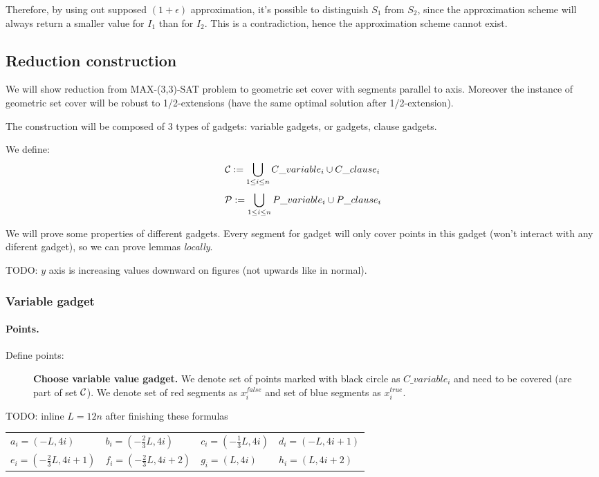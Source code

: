 Therefore, by using out supposed $(1+\epsilon)$ approximation,
it’s possible to distinguish $S_1$ from $S_2$, since
the approximation scheme will always return a smaller value
for $I_1$ than for $I_2$. This is a contradiction,
hence the approximation scheme cannot exist.

\subsection{Reduction construction}
We will show reduction from MAX-(3,3)-SAT problem
to geometric set cover with segments
parallel to axis. Moreover the instance
of geometric set cover will be robust
to 1/2-extensions (have the same optimal solution
after 1/2-extension).

The construction will be composed of 3 types of gadgets:
variable gadgets, or gadgets, clause gadgets.

We define:
$$\mathcal{C} := \bigcup_{1 \le i \le n} C\_variable_i \cup C\_clause_i $$
$$\mathcal{P} := \bigcup_{1 \le i \le n} P\_variable_i \cup P\_clause_i $$

We will prove some properties of different gadgets.
Every segment for gadget will only cover points 
in this gadget (won't interact with any diferent gadget),
so we can prove lemmas \textit{locally}.


TODO: $y$ axis is increasing values downward on figures
(not upwards like in normal).

\subsubsection{Variable gadget}

\paragraph{Points.}

Define points:
\begin{figure}[h]
\centering
\def\svgwidth{0.5\columnwidth}

\caption{\textbf{Choose variable value gadget.}
We denote set of points marked with black circle as $C\_variable_i$
and need to be covered (are part of set $\mathcal{C}$).
We denote set of red segments as $x^{false}_i$
and set of blue segments as $x^{true}_i$.}
\label{fig:apx_choose_variable}
\end{figure}

TODO: inline $L = 12n$ after finishing these formulas

\begin{center}
\begin{tabular}{ l l l l}
	$a_{i} = (-L, 4i)$ &
	$b_{i} = (-\frac{2}{3}L, 4i)$ & 
	$c_{i} = (-\frac{1}{3}L, 4i)$ & 
	$d_{i} = (-L, 4i+1)$ \\  
	$e_{i} = (-\frac{2}{3}L, 4i+1)$ & 
	$f_{i} = (-\frac{2}{3}L, 4i+2)$ &
	$g_i = (L, 4i)$ &
	$h_i = (L, 4i+2)$
\end{tabular}
\end{center}

